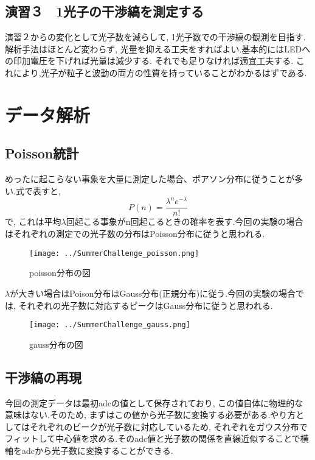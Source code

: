 \documentclass[uplatex,10pt,a4j]{jsarticle}
\begin{document}
\subsection{演習３　1光子の干渉縞を測定する}
演習２からの変化として光子数を減らして, 1光子数での干渉縞の観測を目指す.解析手法はほとんど変わらず, 光量を抑える工夫をすればよい.基本的にはLEDへの印加電圧を下げれば光量は減少する. それでも足りなければ適宜工夫する.
これにより,光子が粒子と波動の両方の性質を持っていることがわかるはずである.
\clearpage



\clearpage



\clearpage
\section{データ解析}


\clearpage


\clearpage
\subsection{Poisson統計}
めったに起こらない事象を大量に測定した場合、ポアソン分布に従うことが多い.式で表すと, 
\begin{equation}
  P\left(n\right)=\frac{\lambda^n e^{-\lambda}}{n!}
\end{equation}
で, これは平均$\lambda$回起こる事象がn回起こるときの確率を表す.今回の実験の場合はそれぞれの測定での光子数の分布はPoisson分布に従うと思われる.
\begin{figure}[h]
  \begin{center}
    \texttt{[image: ../SummerChallenge\_poisson.png]}
    \caption{poisson分布の図}
    \label{fig:poisson}
  \end{center}
\end{figure}

$\lambda$が大きい場合はPoison分布はGauss分布(正規分布)に従う.今回の実験の場合では, それぞれの光子数に対応するピークはGauss分布に従うと思われる.
\begin{figure}[h]
  \begin{center}
    \texttt{[image: ../SummerChallenge\_gauss.png]}
    \caption{gauss分布の図}
    \label{fig:gauss}
  \end{center}
\end{figure}

\subsection{干渉縞の再現}
今回の測定データは最初adcの値として保存されており, この値自体に物理的な意味はない.そのため, まずはこの値から光子数に変換する必要がある.やり方としてはそれぞれのピークが光子数に対応しているため, それぞれをガウス分布でフィットして中心値を求める.そのadc値と光子数の関係を直線近似することで横軸をadcから光子数に変換することができる.
\end{document}
